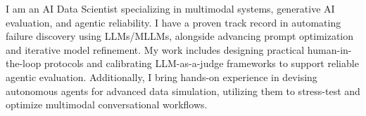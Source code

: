 \small{I am an AI Data Scientist specializing in multimodal systems, generative AI evaluation, and agentic reliability. I have a proven track record in automating failure discovery using LLMs/MLLMs, alongside advancing prompt optimization and iterative model refinement. My work includes designing practical human-in-the-loop protocols and calibrating LLM-as-a-judge frameworks to support reliable agentic evaluation. Additionally, I bring hands-on experience in devising autonomous agents for advanced data simulation, utilizing them to stress-test and optimize multimodal conversational workflows.}

 
   